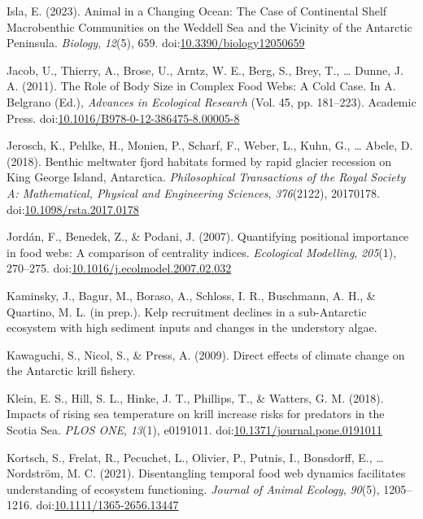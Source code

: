 \documentclass[
]{article}
\newlength{\cslhangindent}
\newenvironment{CSLReferences}[2] %
 {\begin{list}{}{%
  \setlength{\itemindent}{0pt}
  \setlength{\leftmargin}{0pt}
  \setlength{\parsep}{0pt}
  \ifodd #1
   \setlength{\leftmargin}{\cslhangindent}
   \setlength{\itemindent}{-1\cslhangindent}
  \fi
  \setlength{\itemsep}{#2\baselineskip}}}
 {\end{list}}
\begin{document}
\begin{CSLReferences}{1}{0}
Isla, E. (2023). Animal in a
{Changing Ocean}: {The Case} of {Continental Shelf Macrobenthic
Communities} on the {Weddell Sea} and the {Vicinity} of the {Antarctic
Peninsula}. \emph{Biology}, \emph{12}(5), 659.
doi:\href{https://doi.org/10.3390/biology12050659}{10.3390/biology12050659}

Jacob, U., Thierry, A., Brose, U., Arntz, W. E., Berg, S., Brey, T.,
\ldots{} Dunne, J. A. (2011). The {Role} of {Body Size} in {Complex Food
Webs}: {A Cold Case}. In A. Belgrano (Ed.), \emph{Advances in
{Ecological Research}} (Vol. 45, pp. 181--223). {Academic Press}.
doi:\href{https://doi.org/10.1016/B978-0-12-386475-8.00005-8}{10.1016/B978-0-12-386475-8.00005-8}

Jerosch, K., Pehlke, H., Monien, P., Scharf, F., Weber, L., Kuhn, G.,
\ldots{} Abele, D. (2018). Benthic meltwater fjord habitats formed by
rapid glacier recession on {King George Island}, {Antarctica}.
\emph{Philosophical Transactions of the Royal Society A: Mathematical,
Physical and Engineering Sciences}, \emph{376}(2122), 20170178.
doi:\href{https://doi.org/10.1098/rsta.2017.0178}{10.1098/rsta.2017.0178}

Jordán, F., Benedek, Z., \& Podani, J. (2007). Quantifying positional
importance in food webs: {A} comparison of centrality indices.
\emph{Ecological Modelling}, \emph{205}(1), 270--275.
doi:\href{https://doi.org/10.1016/j.ecolmodel.2007.02.032}{10.1016/j.ecolmodel.2007.02.032}

Kaminsky, J., Bagur, M., Boraso, A., Schloss, I. R., Buschmann, A. H.,
\& Quartino, M. L. (in prep.). Kelp recruitment declines in a
sub-{Antarctic} ecosystem with high sediment inputs and changes in the
understory algae.

Kawaguchi, S., Nicol, S., \& Press, A. (2009). Direct effects of climate
change on the {Antarctic} krill fishery.

Klein, E. S., Hill, S. L., Hinke, J. T., Phillips, T., \& Watters, G. M.
(2018). Impacts of rising sea temperature on krill increase risks for
predators in the {Scotia Sea}. \emph{PLOS ONE}, \emph{13}(1), e0191011.
doi:\href{https://doi.org/10.1371/journal.pone.0191011}{10.1371/journal.pone.0191011}

Kortsch, S., Frelat, R., Pecuchet, L., Olivier, P., Putnis, I.,
Bonsdorff, E., \ldots{} Nordström, M. C. (2021). Disentangling temporal
food web dynamics facilitates understanding of ecosystem functioning.
\emph{Journal of Animal Ecology}, \emph{90}(5), 1205--1216.
doi:\href{https://doi.org/10.1111/1365-2656.13447}{10.1111/1365-2656.13447}


\end{CSLReferences}
\end{document}
